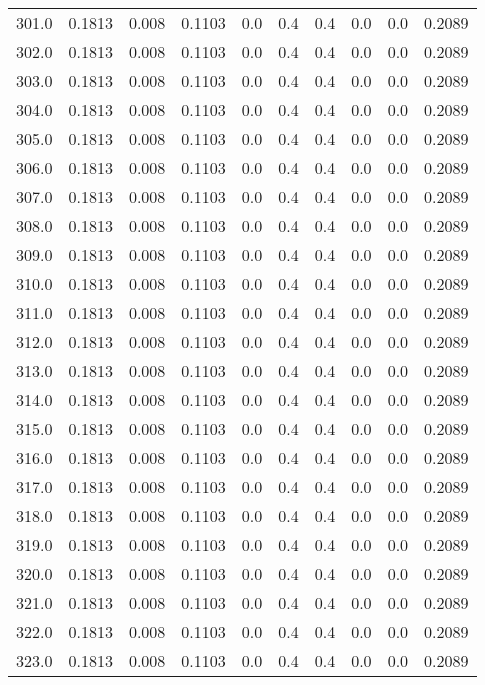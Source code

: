 \begin{longtable}{lrrrrrrrrr}
301.0 & 0.1813 & 0.008 & 0.1103 & 0.0 & 0.4 & 0.4 & 0.0 & 0.0 & 0.2089 \\
302.0 & 0.1813 & 0.008 & 0.1103 & 0.0 & 0.4 & 0.4 & 0.0 & 0.0 & 0.2089 \\
303.0 & 0.1813 & 0.008 & 0.1103 & 0.0 & 0.4 & 0.4 & 0.0 & 0.0 & 0.2089 \\
304.0 & 0.1813 & 0.008 & 0.1103 & 0.0 & 0.4 & 0.4 & 0.0 & 0.0 & 0.2089 \\
305.0 & 0.1813 & 0.008 & 0.1103 & 0.0 & 0.4 & 0.4 & 0.0 & 0.0 & 0.2089 \\
306.0 & 0.1813 & 0.008 & 0.1103 & 0.0 & 0.4 & 0.4 & 0.0 & 0.0 & 0.2089 \\
307.0 & 0.1813 & 0.008 & 0.1103 & 0.0 & 0.4 & 0.4 & 0.0 & 0.0 & 0.2089 \\
308.0 & 0.1813 & 0.008 & 0.1103 & 0.0 & 0.4 & 0.4 & 0.0 & 0.0 & 0.2089 \\
309.0 & 0.1813 & 0.008 & 0.1103 & 0.0 & 0.4 & 0.4 & 0.0 & 0.0 & 0.2089 \\
310.0 & 0.1813 & 0.008 & 0.1103 & 0.0 & 0.4 & 0.4 & 0.0 & 0.0 & 0.2089 \\
311.0 & 0.1813 & 0.008 & 0.1103 & 0.0 & 0.4 & 0.4 & 0.0 & 0.0 & 0.2089 \\
312.0 & 0.1813 & 0.008 & 0.1103 & 0.0 & 0.4 & 0.4 & 0.0 & 0.0 & 0.2089 \\
313.0 & 0.1813 & 0.008 & 0.1103 & 0.0 & 0.4 & 0.4 & 0.0 & 0.0 & 0.2089 \\
314.0 & 0.1813 & 0.008 & 0.1103 & 0.0 & 0.4 & 0.4 & 0.0 & 0.0 & 0.2089 \\
315.0 & 0.1813 & 0.008 & 0.1103 & 0.0 & 0.4 & 0.4 & 0.0 & 0.0 & 0.2089 \\
316.0 & 0.1813 & 0.008 & 0.1103 & 0.0 & 0.4 & 0.4 & 0.0 & 0.0 & 0.2089 \\
317.0 & 0.1813 & 0.008 & 0.1103 & 0.0 & 0.4 & 0.4 & 0.0 & 0.0 & 0.2089 \\
318.0 & 0.1813 & 0.008 & 0.1103 & 0.0 & 0.4 & 0.4 & 0.0 & 0.0 & 0.2089 \\
319.0 & 0.1813 & 0.008 & 0.1103 & 0.0 & 0.4 & 0.4 & 0.0 & 0.0 & 0.2089 \\
320.0 & 0.1813 & 0.008 & 0.1103 & 0.0 & 0.4 & 0.4 & 0.0 & 0.0 & 0.2089 \\
321.0 & 0.1813 & 0.008 & 0.1103 & 0.0 & 0.4 & 0.4 & 0.0 & 0.0 & 0.2089 \\
322.0 & 0.1813 & 0.008 & 0.1103 & 0.0 & 0.4 & 0.4 & 0.0 & 0.0 & 0.2089 \\
323.0 & 0.1813 & 0.008 & 0.1103 & 0.0 & 0.4 & 0.4 & 0.0 & 0.0 & 0.2089 \\

\end{longtable}
